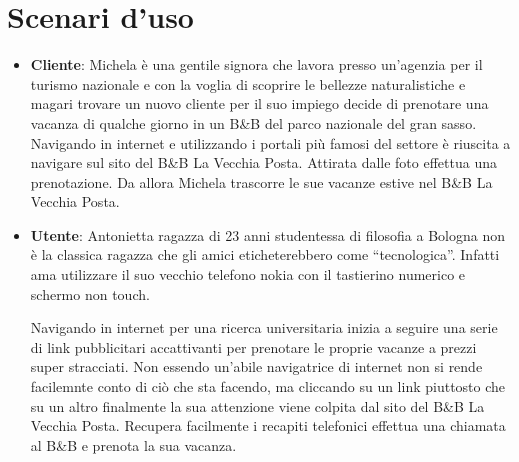 \documentclass[a4paper,12pt,hidelinks]{report}
\begin{document}
\section{Scenari d'uso}
  \par
  \begin{itemize}
  \item \textbf{Cliente}: Michela è una gentile signora che lavora presso un'agenzia per il turismo nazionale e con la voglia di scoprire le bellezze naturalistiche e magari trovare
  un nuovo cliente per il suo impiego decide di prenotare una vacanza di qualche giorno in un B\&B del parco nazionale del gran sasso. Navigando in internet e utilizzando i portali 
  più famosi del settore è riuscita a navigare sul sito del B\&B La Vecchia Posta. Attirata dalle foto effettua una prenotazione. Da allora Michela trascorre le sue vacanze estive nel 
  B\&B La Vecchia Posta.
  
  \item \textbf{Utente}: Antonietta ragazza di 23 anni studentessa di filosofia a Bologna non è la classica ragazza che gli amici eticheterebbero come ``tecnologica''. Infatti ama utilizzare
  il suo vecchio telefono nokia con il tastierino numerico e schermo non touch. 
  \par Navigando in internet per una ricerca universitaria inizia a seguire una serie di link pubblicitari accattivanti
  per prenotare le proprie vacanze a prezzi super stracciati. Non essendo un'abile navigatrice di internet non si rende facilemnte conto di ciò che sta facendo, ma cliccando su un link piuttosto che su un altro
  finalmente la sua attenzione viene colpita dal sito del B\&B La Vecchia Posta. Recupera facilmente i recapiti telefonici effettua una chiamata al B\&B e prenota la sua vacanza.
  \end{itemize}
\end{document}
